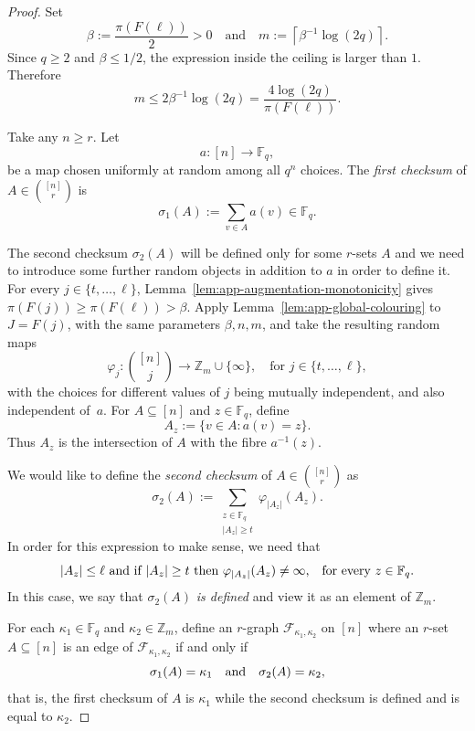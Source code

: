 \documentclass[10pt,a4paper]{article}
\numberwithin{equation}{section}
\theoremstyle{definition}
\theoremstyle{remark}
\newcommand{\Z}[1]{\mathbb Z_{#1}}
\newcommand{\CSOne}{\sigma_1}
\newcommand{\CSTwo}{\sigma_2}
\newcommand{\n}[2]{|#2_{#1}|}
\newcommand{\F}[2]{\mathcal F_{#1,#2}}
\newcommand{\PP}{m}
\renewcommand{\longrightarrow}{\to}
\begin{document}
\begin{proof}
Set
\[
 \beta:=\frac{\pi(F(\ell))}{2}>0
 \quad\text{and}\quad
 \PP:=\left\lceil\beta^{-1}\log(2q)\right\rceil.
\]
Since $q\ge2$ and $\beta\le1/2$, the expression inside the ceiling is larger than $1$.  Therefore
\begin{equation}\label{eq:app-P-bound}
 \PP\le2\beta^{-1}\log(2q)
 =\frac{4\log(2q)}{\pi(F(\ell))}.
\end{equation}

Take any $n\ge r$. Let
\[
 a:[n]\longrightarrow\mathbb F_q,
\]
 be a map chosen uniformly at random among all $q^n$ choices.
The \emph{first checksum} of $A\in \binom{[n]}{r}$ is
\[
\CSOne(A):=\sum_{v\in A} a(v)\in\mathbb F_q.
\]  

The second checksum $\CSTwo(A)$ will be defined only for some $r$-sets $A$ and we need to introduce some further random objects in addition to $a$ in order to define it. For every $j\in\{t,\ldots,\ell\}$, Lemma~\ref{lem:app-augmentation-monotonicity} gives
\(
\pi(F(j))\ge\pi(F(\ell))>\beta.
\)
Apply Lemma~\ref{lem:app-global-colouring} to $J=F(j)$, with the same parameters $\beta,n,\PP$, and take the resulting random maps
\[
\varphi_j:\binom{[n]}j\longrightarrow
\Z{\PP}\cup\{\infty\},\quad \text{for  $j\in \{t,\ldots,\ell\}$},
\]
with the choices for different values of $j$ being mutually independent, and also independent of~$a$. For $A\subseteq[n]$ and $z\in\mathbb F_q$, define
\[
 A_z:=\{v\in A:a(v)=z\}
.
\]
 Thus $A_z$ is the intersection of $A$ with the fibre $a^{-1}(z)$.
 
We would like to define the  \emph{second checksum} of $A\in \binom{[n]}r$ as
 \[
 \CSTwo(A):=\sum_{\substack{z\in\mathbb F_q\\ \n{z}{A}\ge t}}\varphi_{\n{z}{A}}(A_z).
 \] 
 In order for this expression to make sense, we need that
 \[
 \text{$\n{z}{A}\le \ell$ and if $\n{z}{A}\ge t$ then $\varphi_{\n{z}{A}}(A_z)\not=\infty$,\quad for every $z\in\mathbb F_q$.}
 \] In this case, we say that $\CSTwo(A)$ \emph{is defined} and view it as an element of $\Z{\PP}$.
 
 
For each $\kappa_1\in\mathbb F_q$ and $\kappa_2\in \Z{\PP}$, define an $r$-graph $\F{\kappa_1}{\kappa_2}$ on $[n]$ where an $r$-set $A\subseteq [n]$ is an edge of $\F{\kappa_1}{\kappa_2}$ if and only if
\[
\text{$\CSOne(A)=\kappa_1$\quad and\quad $\CSTwo(A)=\kappa_2$,}
	\]
	that is, the first checksum of $A$ is $\kappa_1$ while the second checksum is defined and is equal to $\kappa_2$.


\end{proof}
\end{document}
